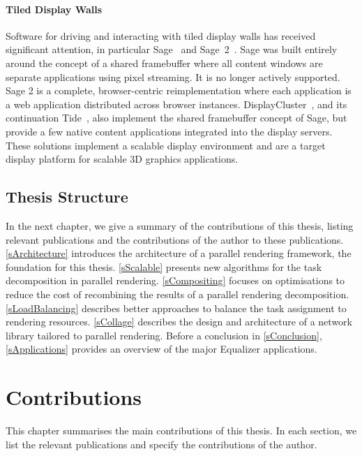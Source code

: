 \subsubsection{Tiled Display Walls}

Software for driving and interacting with tiled display walls has received
significant attention, in particular {Sage}~\cite{Sage} and
 {Sage~2}~\cite{Sage2}. {Sage} was built entirely
around the concept of a shared framebuffer where all content windows are
separate applications using pixel streaming. It is no longer actively supported.
{Sage 2} is a complete, browser-centric reimplementation where each
application is a web application distributed across browser instances.
{DisplayCluster}~\cite{DisplayCluster}, and its continuation
 {Tide}~\cite{tide}, also implement the shared framebuffer concept of
 {Sage}, but provide a few native content applications integrated into the
display servers. These solutions implement a scalable display environment and
are a target display platform for scalable 3D graphics applications.

\section{Thesis Structure}

In the next chapter, we
give a summary of the contributions of this thesis, listing relevant
publications and the contributions of the author to these publications.
\cref{sArchitecture} introduces the architecture of a parallel rendering
framework, the foundation for this thesis. \cref{sScalable} presents new
algorithms for the task decomposition in parallel rendering.
\cref{sCompositing} focuses on optimisations to reduce the cost of recombining
the results of a parallel rendering decomposition. \cref{sLoadBalancing}
describes better approaches to balance the task assignment to rendering
resources. \cref{sCollage} describes the design and architecture of a network
library tailored to parallel rendering. Before a conclusion in
\cref{sConclusion}, \cref{sApplications} provides an overview of the major
Equalizer applications.


\chapter{Contributions}

This chapter summarises the main contributions of this thesis. In each section,
we list the relevant publications and specify the contributions of the author.

